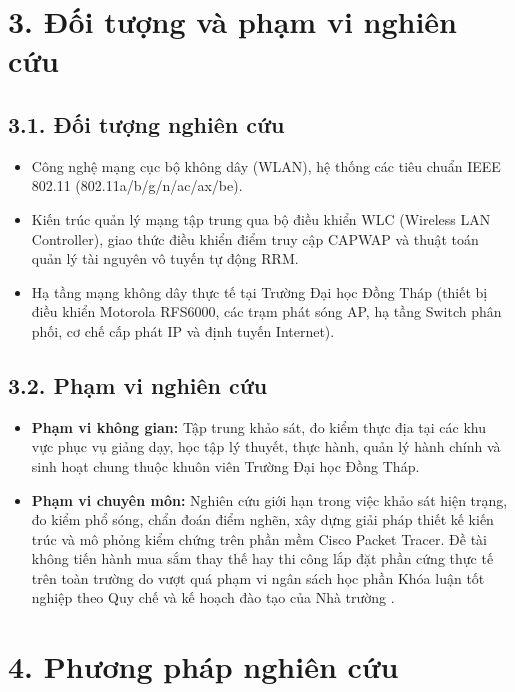 \section*{3. Đối tượng và phạm vi nghiên cứu}

\subsection*{3.1. Đối tượng nghiên cứu}
\begin{itemize}
    \item Công nghệ mạng cục bộ không dây (WLAN), hệ thống các tiêu chuẩn IEEE 802.11 (802.11a/b/g/n/ac/ax/be).
    \item Kiến trúc quản lý mạng tập trung qua bộ điều khiển WLC (Wireless LAN Controller), giao thức điều khiển điểm truy cập CAPWAP và thuật toán quản lý tài nguyên vô tuyến tự động RRM.
    \item Hạ tầng mạng không dây thực tế tại Trường Đại học Đồng Tháp (thiết bị điều khiển Motorola RFS6000, các trạm phát sóng AP, hạ tầng Switch phân phối, cơ chế cấp phát IP và định tuyến Internet).
\end{itemize}

\subsection*{3.2. Phạm vi nghiên cứu}
\begin{itemize}
    \item \textbf{Phạm vi không gian:} Tập trung khảo sát, đo kiểm thực địa tại các khu vực phục vụ giảng dạy, học tập lý thuyết, thực hành, quản lý hành chính và sinh hoạt chung thuộc khuôn viên Trường Đại học Đồng Tháp.
    \item \textbf{Phạm vi chuyên môn:} Nghiên cứu giới hạn trong việc khảo sát hiện trạng, đo kiểm phổ sóng, chẩn đoán điểm nghẽn, xây dựng giải pháp thiết kế kiến trúc và mô phỏng kiểm chứng trên phần mềm Cisco Packet Tracer. Đề tài không tiến hành mua sắm thay thế hay thi công lắp đặt phần cứng thực tế trên toàn trường do vượt quá phạm vi ngân sách học phần Khóa luận tốt nghiệp theo Quy chế và kế hoạch đào tạo của Nhà trường \cite{dthu2026quyche}.
\end{itemize}

\section*{4. Phương pháp nghiên cứu}

